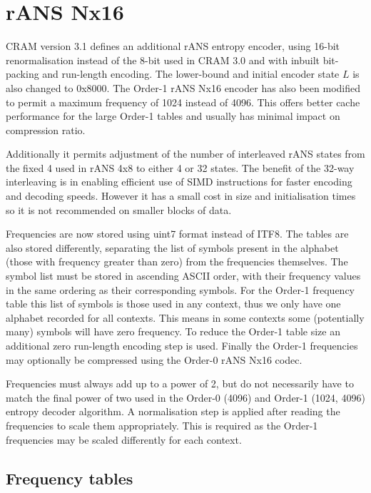 \documentclass[a4paper]{article}
\begin{document}
\section{rANS Nx16}

CRAM version 3.1 defines an additional rANS entropy encoder, using
16-bit renormalisation instead of the 8-bit used in CRAM 3.0 and with
inbuilt bit-packing and run-length encoding.  The lower-bound and
initial encoder state $L$ is also changed to 0x8000. The Order-1 rANS
Nx16 encoder has also been modified to permit a maximum frequency of 1024
instead of 4096.  This offers better cache performance for the large
Order-1 tables and usually has minimal impact on compression ratio.

Additionally it permits adjustment of the number of interleaved rANS
states from the fixed 4 used in rANS 4x8 to either 4 or 32 states.
The benefit of the 32-way interleaving is in enabling efficient use of
SIMD instructions for faster encoding and decoding speeds.  However it
has a small cost in size and initialisation times so it is not
recommended on smaller blocks of data.

Frequencies are now stored using uint7 format instead of ITF8.  The
tables are also stored differently, separating the list of symbols
present in the alphabet (those with frequency greater than zero) from
the frequencies themselves.  The symbol list must be stored in
ascending ASCII order, with their frequency values in the same
ordering as their corresponding symbols.  For the Order-1 frequency
table this list of symbols is those used in any context, thus we only
have one alphabet recorded for all contexts.  This means in some
contexts some (potentially many) symbols will have zero frequency.  To
reduce the Order-1 table size an additional zero run-length encoding
step is used.  Finally the Order-1 frequencies may optionally be
compressed using the Order-0 rANS Nx16 codec.

Frequencies must always add up to a power of 2, but do not necessarily
have to match the final power of two used in the Order-0 (4096) and
Order-1 (1024, 4096) entropy decoder algorithm.  A normalisation step is
applied after reading the frequencies to scale them appropriately.
This is required as the Order-1 frequencies may be scaled differently
for each context.

\subsection{Frequency tables}
\end{document}
